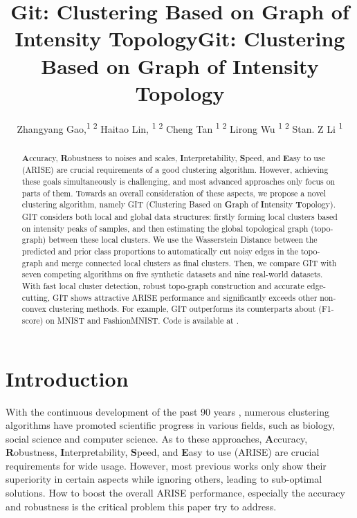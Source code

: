 \documentclass[letterpaper]{article} \usepackage{aaai22}  \usepackage{times}  \usepackage{helvet}  \usepackage{courier}  \usepackage[hyphens]{url}  \usepackage{graphicx} \urlstyle{rm} \def\UrlFont{\rm}  \usepackage{natbib}  \usepackage{caption} \DeclareCaptionStyle{ruled}{labelfont=normalfont,labelsep=colon,strut=off} \frenchspacing  \setlength{\pdfpagewidth}{8.5in}  \setlength{\pdfpageheight}{11in}  \usepackage{subfigure}
\title{Git: Clustering Based on Graph of Intensity Topology}
\title{Git: Clustering Based on Graph of Intensity Topology}
\author {
Zhangyang Gao,\textsuperscript{\rm 1 2}
    Haitao Lin, \textsuperscript{\rm 1 2}
    Cheng Tan \textsuperscript{\rm 1 2}
    Lirong Wu \textsuperscript{\rm 1 2}
    Stan. Z Li \textsuperscript{\rm 1}
}
\begin{document}
\maketitle



\begin{abstract}

\textbf{A}ccuracy, \textbf{R}obustness to noises and scales, \textbf{I}nterpretability, \textbf{S}peed, and \textbf{E}asy to use (ARISE) are crucial requirements of a good clustering algorithm. However, achieving these goals simultaneously is challenging, and most advanced approaches only focus on parts of them. Towards an overall consideration of these aspects, we propose a novel clustering algorithm, namely GIT (Clustering Based on \textbf{G}raph of \textbf{I}ntensity \textbf{T}opology). GIT considers both local and global data structures: firstly forming local clusters based on intensity peaks of samples, and then estimating the global topological graph (topo-graph) between these local clusters. We use the Wasserstein Distance between the predicted and prior class proportions to automatically cut noisy edges in the topo-graph and merge connected local clusters as final clusters. Then, we compare GIT with seven competing algorithms on five synthetic datasets and nine real-world datasets. With fast local cluster detection, robust topo-graph construction and accurate edge-cutting, GIT shows attractive ARISE performance and significantly exceeds other non-convex clustering methods. For example, GIT outperforms its counterparts about  (F1-score) on MNIST and FashionMNIST. Code is available at \color{red}{https://github.com/gaozhangyang/GIT}.

\end{abstract}

\section{Introduction}
With the continuous development of the past 90 years \cite{driver1932quantitative, zubin1938technique, tryon1939cluster}, numerous clustering algorithms \cite{jain1999data, saxena2017review, gan2020data} have promoted scientific progress in various fields, such as biology, social science and computer science. As to these approaches, \textbf{A}ccuracy, \textbf{R}obustness, \textbf{I}nterpretability, \textbf{S}peed, and \textbf{E}asy to use (ARISE) are crucial requirements for wide usage. However, most previous works only show their superiority in certain aspects while ignoring others, leading to sub-optimal solutions. How to boost the overall ARISE performance, especially the accuracy and robustness is the critical problem this paper try to address.
\end{document}
